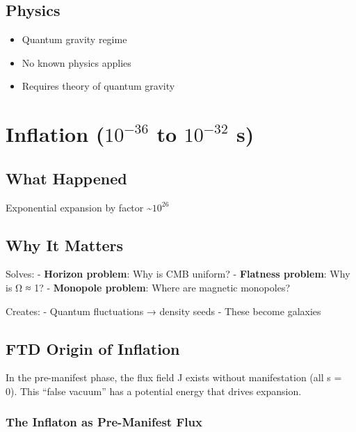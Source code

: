 \documentclass[
  11pt,
  letterpaper,
  twoside,
  openright]{book}
\providecommand{\tightlist}{%
  \setlength{\itemsep}{0pt}\setlength{\parskip}{0pt}}
\begin{document}
\subsection{Physics}\label{physics}

\begin{itemize}
\tightlist
\item
  Quantum gravity regime
\item
  No known physics applies
\item
  Requires theory of quantum gravity
\end{itemize}

\section{\texorpdfstring{Inflation (\(10^{-36}\) to \(10^{-32}\)
s)}{Inflation (10\^{}\{-36\} to 10\^{}\{-32\} s)}}\label{inflation-10-36-to-10-32-s}

\subsection{What Happened}\label{what-happened}

Exponential expansion by factor \textasciitilde{}\(10^{26}\)

\subsection{Why It Matters}\label{why-it-matters}

Solves: - \textbf{Horizon problem}: Why is CMB uniform? -
\textbf{Flatness problem}: Why is Ω ≈ 1? - \textbf{Monopole problem}:
Where are magnetic monopoles?

Creates: - Quantum fluctuations → density seeds - These become galaxies

\subsection{FTD Origin of Inflation}\label{ftd-origin-of-inflation}

In the pre-manifest phase, the flux field J exists without manifestation
(all s = 0). This ``false vacuum'' has a potential energy that drives
expansion.

\subsubsection{The Inflaton as Pre-Manifest
Flux}\label{the-inflaton-as-pre-manifest-flux}
\end{document}
